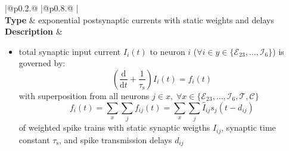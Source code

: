 \documentclass[10pt,a4paper,twoside,american]{article}
\theoremstyle{definitionstyle}
\newcommand{\diff}{\ensuremath{\text{d}}}
\newcommand{\tauS}{\tau_\text{s}}
\begin{document}
\begin{table}
\begin{tabular}{
  |@{\hspace*{\marg}}p{}@{\hspace*{\marg}}
  |@{\hspace*{\marg}}p{}@{\hspace*{\marg}}
  |}
  \hline 
  \\
  \hline 
  \textbf{Type} & exponential postsynaptic currents with static weights and delays \\
  \hline 
  \textbf{Description} &
  \begin{itemize}
	\item total synaptic input current $I_i(t)$ to neuron $i$ ($\forall i \in y\in\{\mathcal{E}_{23},\ldots,\mathcal{I}_{6}\}$) is governed by:
		\begin{equation}
			\label{eq:synaptic_current}
			\left(\frac{\diff}{\diff t} + \frac{1}{\tauS}\right) I_{i} (t) = f_{i}(t)
		\end{equation}
		with superposition from all neurons $j \in x,\;\forall x\in\{\mathcal{E}_{23},\ldots,\mathcal{I}_{6}, \mathcal{T}, \mathcal{C}\}$
		\begin{equation*}
			f_{i} (t) = \sum_{x} \sum_{j} f_{ij} (t) = \sum_{x} \sum_{j} \hat{I}_{ij} s_{j}(t-d_{ij})
		\end{equation*}
		  of weighted spike trains with static synaptic weigths $\hat{I}_{ij}$, synaptic time constant $\tauS$, and spike transmission delays $d_{ij}$
		

\end{itemize}
\end{tabular}
\end{table}
\end{document}
